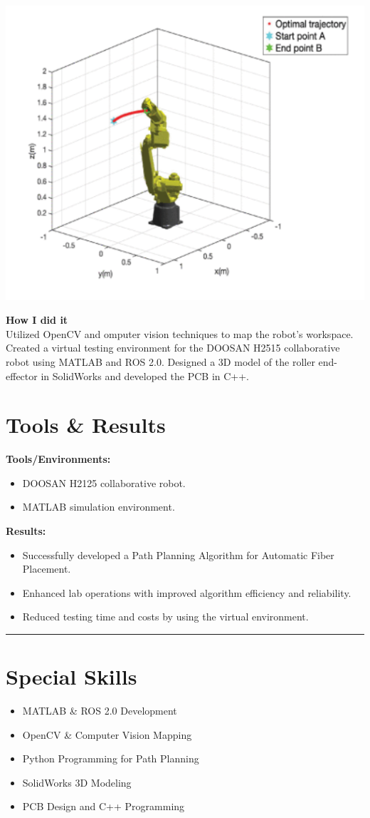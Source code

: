 \documentclass[a4paper]{article}
\begin{document}
\includegraphics[width=.5\textwidth]{images/DoosanVectors.png}
\parbox[b]{.6\textwidth}{
    \textbf{How I did it} \\
    Utilized OpenCV and omputer vision techniques to map the robot's workspace.
    Created a virtual testing environment for the DOOSAN H2515 collaborative robot using MATLAB and ROS 2.0.
    Designed a 3D model of the roller end-effector in SolidWorks and developed the PCB in C++.

}
\section*{Tools \& Results}
\textbf{Tools/Environments:}
\begin{itemize}[leftmargin=*, noitemsep]
    \item DOOSAN H2125 collaborative robot.
    \item MATLAB simulation environment.
\end{itemize}

\vspace{0.5em}
\textbf{Results:}
\begin{itemize}[leftmargin=*, noitemsep]
    \item Successfully developed a Path Planning Algorithm for Automatic Fiber Placement.
    \item Enhanced lab operations with improved algorithm efficiency and reliability.
    \item Reduced testing time and costs by using the virtual environment.
\end{itemize}

\vfill
\hrule
\vspace{0.5em}

\section*{Special Skills}
\begin{itemize}[leftmargin=*, noitemsep]
    \item MATLAB \& ROS 2.0 Development
    \item OpenCV \& Computer Vision Mapping
    \item Python Programming for Path Planning
    \item SolidWorks 3D Modeling
    \item PCB Design and C++ Programming
\end{itemize}
\end{document}
